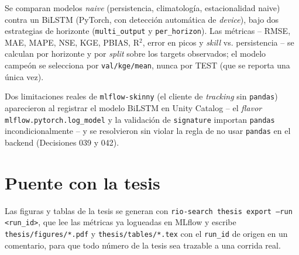 Se comparan modelos \emph{naive} (persistencia, climatolog\'ia, estacionalidad naive) contra un
BiLSTM (PyTorch, con detecci\'on autom\'atica de \emph{device}), bajo dos estrategias de horizonte
(\texttt{multi\_output} y \texttt{per\_horizon}). Las m\'etricas -- RMSE, MAE, MAPE, NSE, KGE,
PBIAS, R$^2$, error en picos y \emph{skill} vs. persistencia -- se calculan por horizonte y por
\emph{split} sobre los targets observados; el modelo campe\'on se selecciona por
\texttt{val/kge/mean}, nunca por TEST (que se reporta una \'unica vez).

Dos limitaciones reales de \texttt{mlflow-skinny} (el cliente de \emph{tracking} sin
\texttt{pandas}) aparecieron al registrar el modelo BiLSTM en Unity Catalog -- el \emph{flavor}
\texttt{mlflow.pytorch.log\_model} y la validaci\'on de \texttt{signature} importan \texttt{pandas}
incondicionalmente -- y se resolvieron sin violar la regla de no usar \texttt{pandas} en el
backend (Decisiones 039 y 042).

\section{Puente con la tesis}

Las figuras y tablas de la tesis se generan con \texttt{rio-search thesis export --run
\textless run\_id\textgreater{}}, que lee las m\'etricas ya logueadas en MLflow y escribe
\texttt{thesis/figures/*.pdf} y \texttt{thesis/tables/*.tex} con el \texttt{run\_id} de origen en
un comentario, para que todo n\'umero de la tesis sea trazable a una corrida real.
